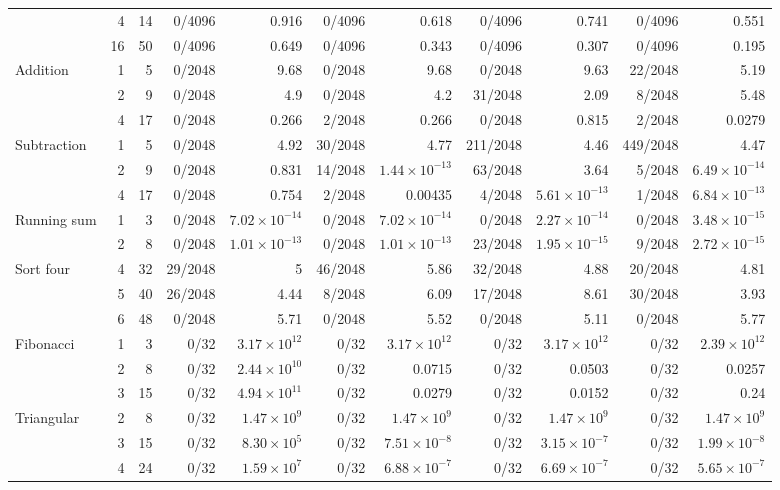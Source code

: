 \begin{table}[htbp]
{\begin{tabular}{@{}lrr *{8}{r}@{}}
 & 4 & 14 & 0/4096 & 0.916 & 0/4096 & 0.618 & 0/4096 & 0.741 & 0/4096 & 0.551 \\
 & 16 & 50 & 0/4096 & 0.649 & 0/4096 & 0.343 & 0/4096 & 0.307 & 0/4096 & 0.195 \\
Addition & 1 & 5 & 0/2048 & 9.68 & 0/2048 & 9.68 & 0/2048 & 9.63 & 22/2048 & 5.19 \\
 & 2 & 9 & 0/2048 & 4.9 & 0/2048 & 4.2 & 31/2048 & 2.09 & 8/2048 & 5.48 \\
 & 4 & 17 & 0/2048 & 0.266 & 2/2048 & 0.266 & 0/2048 & 0.815 & 2/2048 & 0.0279 \\
Subtraction & 1 & 5 & 0/2048 & 4.92 & 30/2048 & 4.77 & 211/2048 & 4.46 & 449/2048 & 4.47 \\
 & 2 & 9 & 0/2048 & 0.831 & 14/2048 & $1.44\!\times\!10^{-13}$ & 63/2048 & 3.64 & 5/2048 & $6.49\!\times\!10^{-14}$ \\
 & 4 & 17 & 0/2048 & 0.754 & 2/2048 & 0.00435 & 4/2048 & $5.61\!\times\!10^{-13}$ & 1/2048 & $6.84\!\times\!10^{-13}$ \\
Running sum & 1 & 3 & 0/2048 & $7.02\!\times\!10^{-14}$ & 0/2048 & $7.02\!\times\!10^{-14}$ & 0/2048 & $2.27\!\times\!10^{-14}$ & 0/2048 & $3.48\!\times\!10^{-15}$ \\
 & 2 & 8 & 0/2048 & $1.01\!\times\!10^{-13}$ & 0/2048 & $1.01\!\times\!10^{-13}$ & 23/2048 & $1.95\!\times\!10^{-15}$ & 9/2048 & $2.72\!\times\!10^{-15}$ \\
Sort four & 4 & 32 & 29/2048 & 5 & 46/2048 & 5.86 & 32/2048 & 4.88 & 20/2048 & 4.81 \\
 & 5 & 40 & 26/2048 & 4.44 & 8/2048 & 6.09 & 17/2048 & 8.61 & 30/2048 & 3.93 \\
 & 6 & 48 & 0/2048 & 5.71 & 0/2048 & 5.52 & 0/2048 & 5.11 & 0/2048 & 5.77 \\
Fibonacci & 1 & 3 & 0/32 & $3.17\!\times\!10^{12}$ & 0/32 & $3.17\!\times\!10^{12}$ & 0/32 & $3.17\!\times\!10^{12}$ & 0/32 & $2.39\!\times\!10^{12}$ \\
 & 2 & 8 & 0/32 & $2.44\!\times\!10^{10}$ & 0/32 & 0.0715 & 0/32 & 0.0503 & 0/32 & 0.0257 \\
 & 3 & 15 & 0/32 & $4.94\!\times\!10^{11}$ & 0/32 & 0.0279 & 0/32 & 0.0152 & 0/32 & 0.24 \\
Triangular & 2 & 8 & 0/32 & $1.47\!\times\!10^{9}$ & 0/32 & $1.47\!\times\!10^{9}$ & 0/32 & $1.47\!\times\!10^{9}$ & 0/32 & $1.47\!\times\!10^{9}$ \\
 & 3 & 15 & 0/32 & $8.30\!\times\!10^{5}$ & 0/32 & $7.51\!\times\!10^{-8}$ & 0/32 & $3.15\!\times\!10^{-7}$ & 0/32 & $1.99\!\times\!10^{-8}$ \\
 & 4 & 24 & 0/32 & $1.59\!\times\!10^{7}$ & 0/32 & $6.88\!\times\!10^{-7}$ & 0/32 & $6.69\!\times\!10^{-7}$ & 0/32 & $5.65\!\times\!10^{-7}$ \\
\bottomrule
\end{tabular}}
\end{table}

